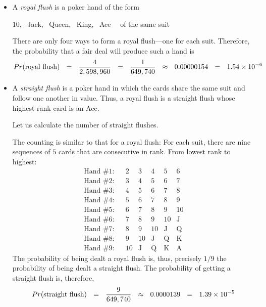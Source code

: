  
\begin{itemize}
\item
A {\it royal flush} is a poker hand of the form

\smallskip

\hspace*{.25in}$10$, \ {\sc Jack}, \ {\sc Queen}, \ {\sc King}, \ {\sc Ace} \ \ of the same suit

\smallskip

\noindent
There are only four ways to form a royal flush---one for each suit.  Therefore, the probability that
a fair deal will produce such a hand is
\[ 
Pr(\mbox{royal flush}) \ \ = \ \
\frac{4}{2,598,960} \ \ = \ \ {1 \over {649,740}} \ \ \approx \ \ 0.00000154 \ \ = \ \ 1.54 \times 10^{-6} \]

\medskip\item
A {\it straight flush} is a poker hand in which the cards share the same suit and follow one 
another in value.  Thus, a royal flush is a straight flush whose highest-rank card is an {\sc Ace}.

\medskip

Let us calculate the number of straight flushes.

\smallskip

The counting is similar to that for a royal flush:  For each suit, there are nine sequences of $5$ cards that are consecutive in rank.  From lowest rank to highest:
\[ \begin{array}{llccccc}
\mbox{Hand \#1}: & &
2 & 3 & 4 & 5 & 6 \\
\mbox{Hand \#2}: & &
3 & 4 & 5 & 6 & 7 \\
\mbox{Hand \#3}: & &
4 & 5 & 6 & 7 & 8 \\
\mbox{Hand \#4}: & &
5 & 6 & 7 & 8 & 9 \\
\mbox{Hand \#5}: & &
6 & 7 & 8 & 9 & 10 \\
\mbox{Hand \#6}: & &
7 & 8 & 9 & 10 &  \mbox{J} \\
\mbox{Hand \#7}: & &
8 & 9 & 10 &  \mbox{J} &   \mbox{Q} \\
\mbox{Hand \#8}: & &
9 & 10 &  \mbox{J} & \mbox{Q} &  \mbox{K}  \\
\mbox{Hand \#9}: & &
10 &  \mbox{J}
     & \mbox{Q}
     & \mbox{K}
     & \mbox{A}
\end{array} \]
The probability of being dealt a royal flush is, thus, precisely $1/9$ the probability of being dealt a straight flush.  The probability of getting a straight flush is, therefore,
\[  Pr(\mbox{straight flush}) \ \ = \ \
{9 \over {649,740}} \ \ \approx \ \ 0.0000139  \ \ = \ \ 1.39 \times 10^{-5} \]


\end{itemize}
